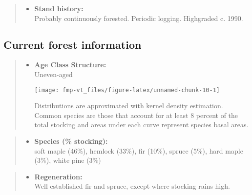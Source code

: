 \documentclass[]{tufte-handout}
\providecommand{\tightlist}{%
  \setlength{\itemsep}{0pt}\setlength{\parskip}{0pt}}
\begin{document}
\begin{quote}
\begin{itemize}
\tightlist
\item
  \textbf{Stand history:}\\
  \vspace{2pt} Probably continuously forested. Periodic logging.
  Highgraded c. 1990.
\end{itemize}
\end{quote}

\subsection{Current forest
information}\label{current-forest-information-2}

\begin{quote}
\begin{itemize}
\tightlist
\item
  \textbf{Age Class Structure:}\\
  \vspace{2pt} Uneven-aged\\

  \begin{marginfigure}
  \texttt{[image: fmp-vt\_files/figure-latex/unnamed-chunk-10-1]} \caption[Distributions are approximated with kernel density estimation]{Distributions are approximated with kernel density estimation. Common species are those that account for at least 8 percent of the total stocking and areas under each curve represent species basal areas.}\label{fig:unnamed-chunk-10}
  \end{marginfigure}
\end{itemize}
\end{quote}

\begin{quote}
\begin{itemize}
\tightlist
\item
  \textbf{Species (\% stocking):}\\
  \vspace{2pt} soft maple (46\%), hemlock (33\%), fir (10\%), spruce
  (5\%), hard maple (3\%), white pine (3\%)
\end{itemize}
\end{quote}

\begin{quote}
\begin{itemize}
\tightlist
\item
  \textbf{Regeneration:}\\
  \vspace{2pt} Well established fir and spruce, except where stocking
  rains high.
\end{itemize}
\end{quote}
\end{document}
